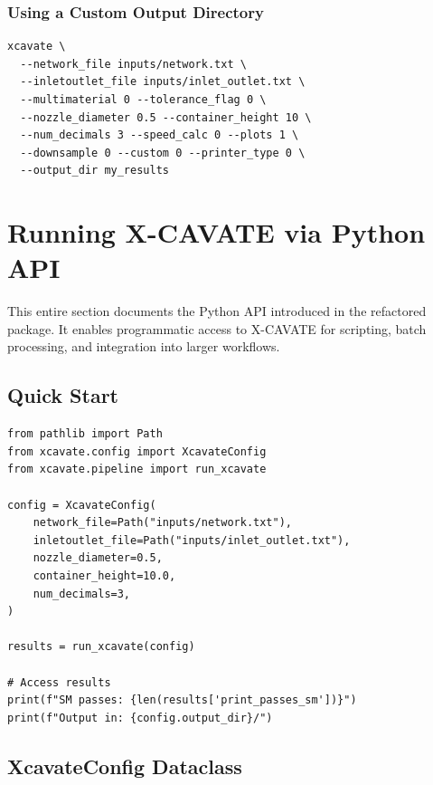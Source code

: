 \documentclass[11pt,letterpaper]{article}
\begin{document}
\subsubsection{Using a Custom Output Directory}

\begin{lstlisting}
xcavate \
  --network_file inputs/network.txt \
  --inletoutlet_file inputs/inlet_outlet.txt \
  --multimaterial 0 --tolerance_flag 0 \
  --nozzle_diameter 0.5 --container_height 10 \
  --num_decimals 3 --speed_calc 0 --plots 1 \
  --downsample 0 --custom 0 --printer_type 0 \
  --output_dir my_results
\end{lstlisting}

\section{Running X-CAVATE via Python API}
\label{sec:python-api}

\begin{claudebox}
This entire section documents the Python API introduced in the refactored
package. It enables programmatic access to X-CAVATE for scripting, batch
processing, and integration into larger workflows.
\end{claudebox}

\subsection{Quick Start}

\begin{lstlisting}[style=python]
from pathlib import Path
from xcavate.config import XcavateConfig
from xcavate.pipeline import run_xcavate

config = XcavateConfig(
    network_file=Path("inputs/network.txt"),
    inletoutlet_file=Path("inputs/inlet_outlet.txt"),
    nozzle_diameter=0.5,
    container_height=10.0,
    num_decimals=3,
)

results = run_xcavate(config)

# Access results
print(f"SM passes: {len(results['print_passes_sm'])}")
print(f"Output in: {config.output_dir}/")
\end{lstlisting}

\subsection{XcavateConfig Dataclass}
\end{document}
